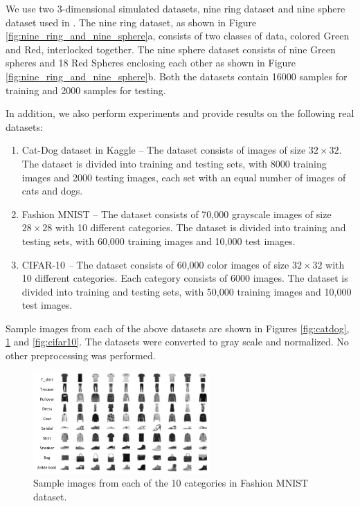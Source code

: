 \documentclass[wcp]{jmlr}
\begin{document}
We use two 3-dimensional simulated datasets, nine ring dataset and nine sphere dataset used in \cite{naitzat2020topology}. The  nine ring dataset, as shown in Figure \ref{fig:nine_ring_and_nine_sphere}a,  consists of two classes of data,  colored Green and Red, interlocked together. The nine sphere dataset consists of nine Green spheres and 18 Red Spheres enclosing each other as shown in Figure \ref{fig:nine_ring_and_nine_sphere}b. Both the datasets contain 16000 samples for training and 2000 samples for testing.

In addition, we also perform experiments and provide results on the following real datasets:
\begin{enumerate}
\item Cat-Dog dataset in Kaggle -- The dataset consists of  images of size $32 \times 32$. The dataset is divided into training and testing sets, with 8000 training images and 2000 testing images,  each set with an equal number of images of cats and dogs.
\item Fashion MNIST -- The dataset consists of 70,000 grayscale images of size $28 \times 28$ with 10 different categories. The dataset is divided into training and testing sets, with 60,000 training images and 10,000 test images.
\item CIFAR-10 -- The dataset consists of 60,000 color images of size $32 \times 32$ with 10 different categories. Each category consists of 6000 images. The dataset is divided into training and testing sets, with 50,000 training images and 10,000 test images.
\end{enumerate}

Sample images from each of the above datasets are shown in Figures \ref{fig:catdog},  \ref{fig:fashionmnist}  and  \ref{fig:cifar10}. The datasets were converted to gray scale and normalized. No other preprocessing was performed.

\begin{figure}[h]
\begin{center}
\includegraphics[width=0.6\textwidth]{images/fashionmnist.png}
\caption{Sample images from each of the 10 categories in Fashion MNIST dataset.}\label{fig:fashionmnist}
\end{center}
\end{figure}
\end{document}
